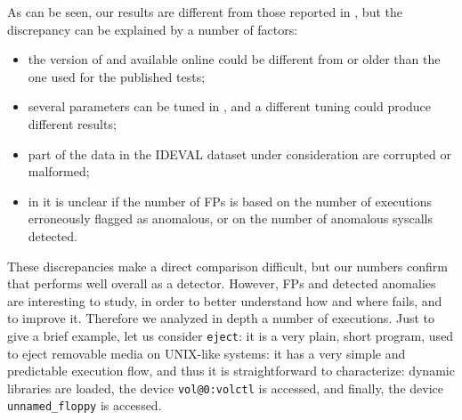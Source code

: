 As can be seen, our results are different from those reported in
\citep{libanomaly}, but the discrepancy can be explained by a number
of factors:

\begin{itemize}
\item the version of \SyscallAnomaly and \LibAnomaly available online
  could be different from or older than the one used for the published
  tests;
\item several parameters can be tuned in \SyscallAnomaly, and a
  different tuning could produce different results;
\item part of the data in the \ac{IDEVAL} dataset under
  consideration are corrupted or malformed;
\item in \citep{libanomaly} it is unclear if the number of
  \acp{FP} is based on the number of executions erroneously
  flagged as anomalous, or on the number of anomalous syscalls
  detected.
\end{itemize}

These discrepancies make a direct comparison difficult, but our
numbers confirm that \SyscallAnomaly performs well overall as a
detector. However, \acp{FP} and detected anomalies are
interesting to study, in order to better understand how and where
\SyscallAnomaly fails, and to improve it. Therefore we analyzed in
depth a number of executions. Just to give a brief example, let us
consider \texttt{eject}: it is a very plain, short program, used to
eject removable media on UNIX-like systems: it has a very simple and
predictable execution flow, and thus it is straightforward to
characterize: dynamic libraries are loaded, the device
\texttt{vol@0:volctl} is accessed, and finally, the device
\texttt{unnamed\_floppy} is accessed.

